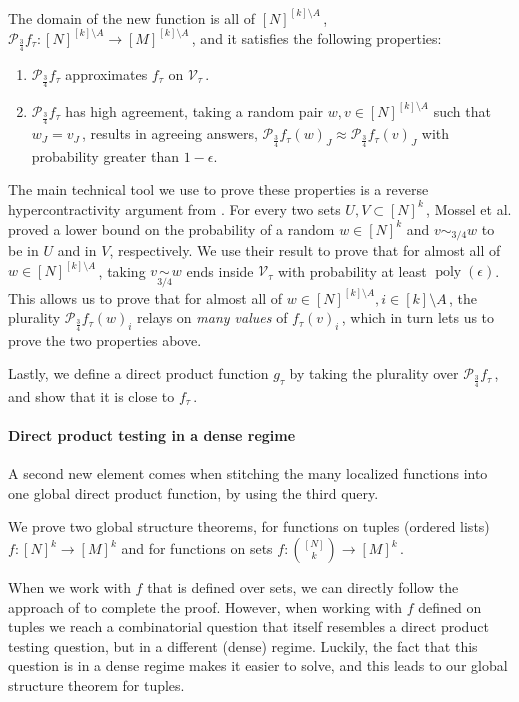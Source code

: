 \documentclass{toc}
\DeclareMathOperator{\poly}{poly} %
\newcommand\f{f} %
\newcommand\pf{g} %
\newcommand{\sets}{\binom{[N]}{k}} %
\newcommand\cons{\mathcal{V}} %
\newcommand\cor[1]{\underset{\scriptscriptstyle#1}{\sim}} %
\begin{document}
The domain of the new function is all of $[N]^{[k]\setminus A}$\,, $\mathcal{P}_\frac{3}{4}f_\tau: [N]^{[k]\setminus A}\rightarrow[M]^{[k]\setminus A}$\,, and it satisfies the following properties:
\begin{enumerate}
	\item $\mathcal{P}_\frac{3}{4}f_\tau$ approximates $f_\tau$ on $\cons_\tau$\,.
	\item $\mathcal{P}_\frac{3}{4}f_\tau$ has high agreement, taking a random pair $w,v\in [N]^{[k]\setminus A}$ such that $w_J=v_J$\,, results in agreeing answers, $\mathcal{P}_\frac{3}{4}f_\tau(w)_J\approx\mathcal{P}_\frac{3}{4}f_\tau(v)_J$ with probability greater than $1-\epsilon$.
\end{enumerate}
The main technical tool we use to prove these properties is a reverse hypercontractivity argument from \cite{mossel2013reverse}. For every two sets $U,V\subset [N]^k$\,, Mossel %
et al.  %
proved a lower bound on the probability of a random $w\in [N]^k$ and $v\sim_{3/4}{w}$ to be in $U$ and 
in %
$V$,   %
 respectively. We use their result to prove that for almost all of $w\in[N]^{[k]\setminus A}$\,, taking $v\cor{3/4}w$ ends inside $\cons_\tau$ with probability at least $\poly(\epsilon)$. This allows us to prove that for almost all of $w\in [N]^{[k]\setminus A},i\in [k]\setminus A$\,, the plurality $\mathcal{P}_\frac{3}{4}f_\tau (w)_i$ relays on \emph{many values} of $f_\tau(v)_i$\,, which in turn lets us to prove the two properties above.

Lastly, we define a direct product function $\pf_\tau$ by taking the plurality over $\mathcal{P}_\frac{3}{4}f_\tau$\,, and show that it is close to $f_\tau$\,.

\paragraph*{Direct product testing in a dense regime}
A second new element comes when stitching the many localized functions into one global direct product function, by using the third query.

We prove two global structure theorems,  for functions on tuples
 (ordered lists) %
$\f:[N]^k\rightarrow[M]^k$ and  for functions on sets $\f:\sets\rightarrow[M]^k$\,.

When we work with $f$ that is defined over sets, we can directly follow the approach of \cite{impagliazzo2012new} to complete the proof. However, when working with $f$ defined on tuples we reach a combinatorial question that itself resembles a direct product testing question, but in a different (dense) regime. Luckily, the fact that this question is in a dense regime makes it easier to solve, and this leads to our global structure theorem for tuples.
\end{document}
